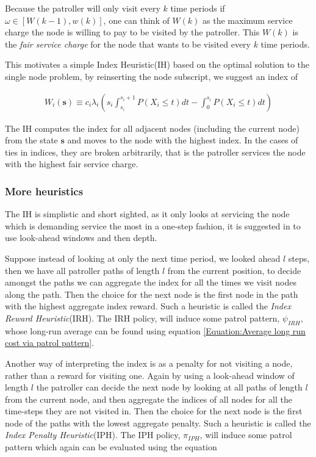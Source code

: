 \documentclass[a4paper,10pt]{article}
\theoremstyle{definition}
\theoremstyle{definition}
\theoremstyle{remark}
\theoremstyle{definition}
\begin{document}
Because the patroller will only visit every $k$ time periods if $\omega \in [W(k-1),w(k)]$, one can think of $W(k)$ as the maximum service charge the node is willing to pay to be visited by the patroller. This $W(k)$ is the \textit{fair service charge} for the node that wants to be visited every $k$ time periods.  

This motivates a simple Index Heuristic(IH) based on the optimal solution to the single node problem, by reinserting the node subscript, we suggest an index of

\begin{align*}
W_{i}(\bm{s}) \equiv c_{i} \lambda_{i} \left(s_{i} \int_{s_{i}}^{s_{i}+1} P(X_{i} \leq t) dt - \int_{0}^{s_{i}} P(X_{i} \leq t) dt \right)
\end{align*}

The IH computes the index for all adjacent nodes (including the current node) from the state $\bm{s}$ and moves to the node with the highest index. In the cases of ties in indices, they are broken arbitrarily, that is the patroller services the node with the highest fair service charge.

\subsubsection{More heuristics}
The IH is simplistic and short sighted, as it only looks at servicing the node which is demanding service the most in a one-step fashion, it is suggested in \cite{Lin2013} to use look-ahead windows and then depth.

Suppose instead of looking at only the next time period, we looked ahead $l$ steps, then we have all patroller paths of length $l$ from the current position, to decide amongst the paths we can aggregate the index for all the times we visit nodes along the path. Then the choice for the next node is the first node in the path with the highest aggregate index reward. Such a heuristic is called the \textit{Index Reward Heuristic}(IRH). The IRH policy, will induce some patrol pattern, $\psi_{IRH}$, whose long-run average can be found using equation \ref{Equation:Average long run cost via patrol pattern}.

Another way of interpreting the index is as a penalty for not visiting a node, rather than a reward for visiting one. Again by using a look-ahead window of length $l$ the patroller can decide the next node by looking at all paths of length $l$ from the current node, and then aggregate the indices of all nodes for all the time-steps they are not visited in. Then the choice for the next node is the first node of the paths with the lowest aggregate penalty. Such a heuristic is called the \textit{Index Penalty Heuristic}(IPH). The IPH policy, $\pi_{IPH}$, will induce some patrol pattern which again can be evaluated using the equation
\end{document}
